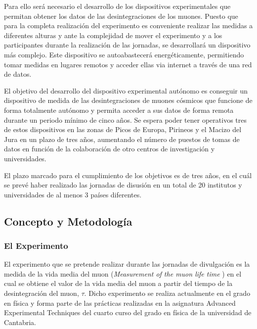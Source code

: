\documentclass[11pt]{extarticle}
\begin{document}
				Para ello será necesario el desarrollo de los dispositivos experimentales que permitan obtener los datos de las desintegraciones de los muones. Puesto que para la completa realización del experimento es conveniente realizar las medidas a diferentes alturas y ante la complejidad de mover el experimento y a los participantes durante la realización de las jornadas, se desarrollará un dispositivo más complejo. Este dispositivo se autoabastecerá energéticamente, permitiendo tomar medidas en lugares remotos y acceder ellas via internet a través de una red de datos.

				El objetivo del desarrollo del dispositivo experimental autónomo es conseguir un dispositivo de medida de las desintegraciones de muones cósmicos que funcione de forma totalmente autónomo y permita acceder a sus datos de forma remota durante un periodo mínimo de cinco años. Se espera poder tener operativos tres de estos dispositivos en las zonas de Picos de Europa, Pirineos y el Macizo del Jura en un plazo de tres años, aumentando el número de puestos de tomas de datos en función de la colaboración de otro centros de investigación y universidades.

				El plazo marcado para el cumplimiento de los objetivos es de tres años, en el cuál se prevé haber realizado las jornadas de disusión en un total de 20 institutos y universidades de al menos 3 países diferentes.

			\subsection{Concepto y Metodología}
				\label{SubSec:PreGeneral:ConcpMet}

				\subsubsection{El Experimento}
					\label{SubSubSec:PreGeneral:ConcpMet:Exprmnt}

					El experimento que se pretende realizar durante las jornadas de divulgación es la medida de la vida media del muon (\textit{Measurement of the muon life time }\cite{guia}) en el cual se obtiene el valor de la vida media del muon a partir del tiempo de la desintegración del muon, $\tau$. Dicho experimento se realiza actualmente en el grado en física y forma parte de las prácticas realizadas en la asignatura Advanced Experimental Techniques del cuarto curso del grado en física de la universidad de Cantabria.
\end{document}
